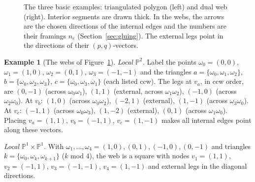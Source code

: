 \documentclass[11pt]{article}
\theoremstyle{plain}
\theoremstyle{definition}
\newtheorem{example}[theorem]{Example}
\theoremstyle{remark}
\newcommand{\PP}{\mathbb{P}}
\begin{document}
\begin{figure}[ht]
\bigskip
{}
\caption{The three basic examples: triangulated polygon (left) and dual web (right). Interior
segments are drawn thick. In the webs, the arrows are the chosen directions of the internal
edges and the numbers are their framings $n_e$ (Section~\ref{sec:gluing}). The external legs
point in the directions of their $(p,q)$-vectors.}
\label{fig:webs}
\end{figure}

\begin{example}[The webs of Figure~\ref{fig:webs}]\label{ex:webs}
\textit{Local $\PP^2$.} Label the points $\omega_0=(0,0)$, $\omega_1=(1,0)$, $\omega_2=(0,1)$,
$\omega_3=(-1,-1)$ and the triangles $a=\{\omega_0,\omega_1,\omega_2\}$,
$b=\{\omega_0,\omega_2,\omega_3\}$, $c=\{\omega_0,\omega_3,\omega_1\}$ (each listed ccw). The
legs at $v_a$, in ccw order, are $(0,-1)$ (across $\omega_0\omega_1$), $(1,1)$ (external, across
$\omega_1\omega_2$), $(-1,0)$ (across $\omega_2\omega_0$). At $v_b$: $(1,0)$ (across
$\omega_0\omega_2$), $(-2,1)$ (external), $(1,-1)$ (across $\omega_3\omega_0$). At $v_c$:
$(-1,1)$ (across $\omega_0\omega_3$), $(1,-2)$ (external), $(0,1)$ (across $\omega_1\omega_0$).
Placing $v_a=(1,1)$, $v_b=(-1,1)$, $v_c=(1,-1)$ makes all internal edges point along these
vectors.

\textit{Local $\PP^1\times\PP^1$.} With $\omega_1,\ldots,\omega_4=(1,0),(0,1),(-1,0),(0,-1)$ and
triangles $k=\{\omega_0,\omega_k,\omega_{k+1}\}$ ($k$ mod 4), the web is a square with nodes
$v_1=(1,1)$, $v_2=(-1,1)$, $v_3=(-1,-1)$, $v_4=(1,-1)$ and external legs in the diagonal
directions.
\end{example}
\end{document}
